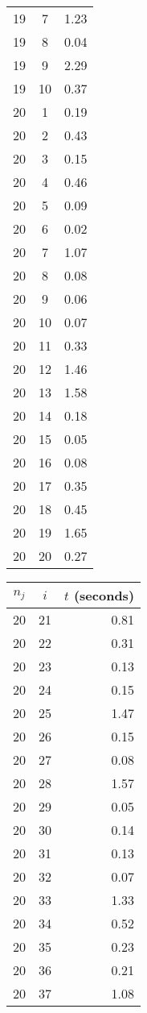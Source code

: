 \documentclass[13pt, letterpaper, oneside]{book}
\begin{document}
\begin{multicols}{5}
\begin{tabular}{c c r}
19 & 7 & 1.23 \\
19 & 8 & 0.04 \\
19 & 9 & 2.29 \\
19 & 10 & 0.37 \\
20 & 1 & 0.19 \\
20 & 2 & 0.43 \\
20 & 3 & 0.15 \\
20 & 4 & 0.46 \\
20 & 5 & 0.09 \\
20 & 6 & 0.02 \\
20 & 7 & 1.07 \\
20 & 8 & 0.08 \\
20 & 9 & 0.06 \\
20 & 10 & 0.07 \\
20 & 11 & 0.33 \\
20 & 12 & 1.46 \\
20 & 13 & 1.58 \\
20 & 14 & 0.18 \\
20 & 15 & 0.05 \\
20 & 16 & 0.08 \\
20 & 17 & 0.35 \\
20 & 18 & 0.45 \\
20 & 19 & 1.65 \\
20 & 20 & 0.27 \\
\bottomrule
\end{tabular}
\vfill
\columnbreak
\begin{tabular}{c c r}
\toprule
$n_j$ & $i$ & $t$ (seconds) \\
\midrule 
20 & 21 & 0.81 \\
20 & 22 & 0.31 \\
20 & 23 & 0.13 \\
20 & 24 & 0.15 \\
20 & 25 & 1.47 \\
20 & 26 & 0.15 \\
20 & 27 & 0.08 \\
20 & 28 & 1.57 \\
20 & 29 & 0.05 \\
20 & 30 & 0.14 \\
20 & 31 & 0.13 \\
20 & 32 & 0.07 \\
20 & 33 & 1.33 \\
20 & 34 & 0.52 \\
20 & 35 & 0.23 \\
20 & 36 & 0.21 \\
20 & 37 & 1.08 \\

\end{tabular}
\end{multicols}
\end{document}
